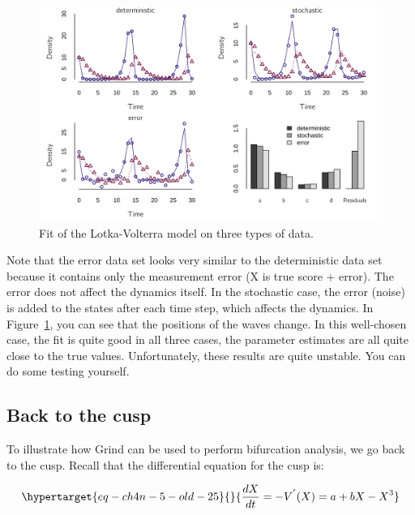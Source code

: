 \documentclass[
  a4paper,
  DIV=11,
  numbers=noendperiod]{scrreprt}
\begin{document}
\begin{figure}

{\centering \includegraphics{media/ch4n/fig-ch4n-img1-old-49.png}

}

\caption{\label{fig-ch4n-img1-old-49}Fit of the Lotka-Volterra model on
three types of data.}

\end{figure}

Note that the error data set looks very similar to the deterministic
data set because it contains only the measurement error (X is true score
+ error). The error does not affect the dynamics itself. In the
stochastic case, the error (noise) is added to the states after each
time step, which affects the dynamics. In
Figure~\ref{fig-ch4n-img1-old-49}, you can see that the positions of the
waves change. In this well-chosen case, the fit is quite good in all
three cases, the parameter estimates are all quite close to the true
values. Unfortunately, these results are quite unstable. You can do some
testing yourself.

\hypertarget{sec-Back-to-the-cusp}{%
\subsection{Back to the cusp}\label{sec-Back-to-the-cusp}}

To illustrate how Grind can be used to perform bifurcation analysis, we
go back to the cusp. Recall that the differential equation for the cusp
is:

\begin{equation}\protect\hypertarget{eq-ch4n-5-old-25}{}{
\frac{dX}{dt} = - V^{'}(X) = {a + bX - X}^{3}
}\label{eq-ch4n-5-old-25}\end{equation}
\end{document}
